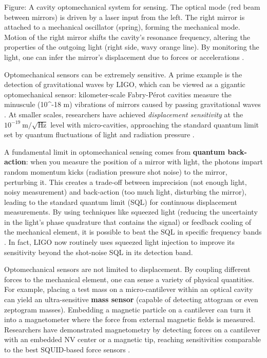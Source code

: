 Figure: A cavity optomechanical system for sensing. The optical mode
(red beam between mirrors) is driven by a laser input from the
left. The right mirror is attached to a mechanical oscillator
(spring), forming the mechanical mode. Motion of the right mirror
shifts the cavity’s resonance frequency, altering the properties of
the outgoing light (right side, wavy orange line). By monitoring the
light, one can infer the mirror’s displacement due to forces or
accelerations .



Optomechanical sensors can be extremely sensitive. A prime example is
the detection of gravitational waves by LIGO, which can be viewed as a
gigantic optomechanical sensor: kilometer-scale Fabry-Pérot cavities
measure the minuscule (10^{-18} m) vibrations of mirrors caused by
passing gravitational waves . At smaller scales, researchers have
achieved \textit{displacement sensitivity} at the
$10^{-19}~\text{m}/\sqrt{\text{Hz}}$ level with micro-cavities,
approaching the standard quantum limit set by quantum fluctuations of
light and radiation pressure .



A fundamental limit in optomechanical sensing comes from
\textbf{quantum back-action}: when you measure the position of a
mirror with light, the photons impart random momentum kicks (radiation
pressure shot noise) to the mirror, perturbing it. This creates a
trade-off between imprecision (not enough light, noisy measurement)
and back-action (too much light, disturbing the mirror), leading to
the standard quantum limit (SQL) for continuous displacement
measurements. By using techniques like squeezed light (reducing the
uncertainty in the light’s phase quadrature that contains the signal)
or feedback cooling of the mechanical element, it is possible to beat
the SQL in specific frequency bands . In fact, LIGO now routinely uses
squeezed light injection to improve its sensitivity beyond the
shot-noise SQL in its detection band.



Optomechanical sensors are not limited to displacement. By coupling
different forces to the mechanical element, one can sense a variety of
physical quantities. For example, placing a test mass on a
micro-cantilever within an optical cavity can yield an ultra-sensitive
\textbf{mass sensor} (capable of detecting attogram or even zeptogram
masses). Embedding a magnetic particle on a cantilever can turn it
into a magnetometer where the force from external magnetic fields is
measured. Researchers have demonstrated magnetometry by detecting
forces on a cantilever with an embedded NV center or a magnetic tip,
reaching sensitivities comparable to the best SQUID-based force
sensors .



